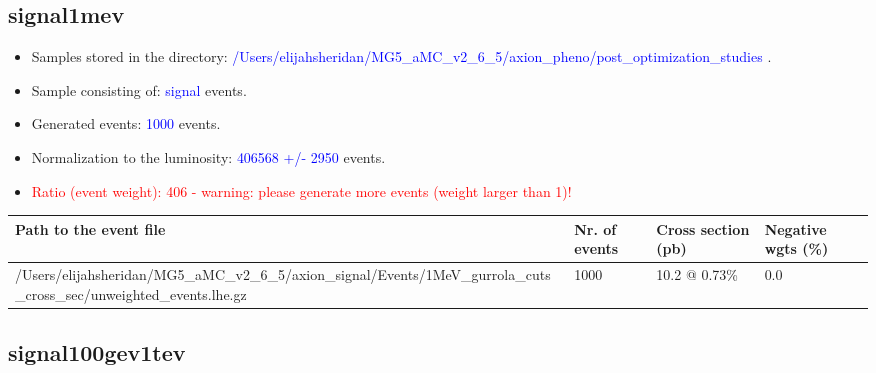 \documentclass[a4paper, 10pt]{article}
\begin{document}
\subsection{ signal1mev}

\begin{itemize}
  \item Samples stored in the directory: \textcolor{blue}{/\-Users/\-elijahsheridan/\-MG5\_aMC\_v2\_6\_5/\-axion\_pheno/\-post\_optimization\_studies} .
   \item Sample consisting of: \textcolor{blue}{signal}  events.
   \item Generated events: \textcolor{blue}{1000 }  events.
   \item Normalization to the luminosity: \textcolor{blue}{406568}\textcolor{blue}{ +/\-- }\textcolor{blue}{2950 }  events.
   \item\textcolor{red}{Ratio (event weight): }\textcolor{red}{406 }\textcolor{red}{ - warning: please generate more events (weight larger than 1)!}
\textcolor{red}{}
\end{itemize}
\begin{table}[H]
  \begin{center}
    \begin{tabular}{|m{55.0mm}|m{25.0mm}|m{30.0mm}|m{30.0mm}|}
      \hline
      {\cellcolor{yellow}         Path to the event file}& {\cellcolor{yellow}         Nr. of events}& {\cellcolor{yellow}         Cross section (pb)}& {\cellcolor{yellow}         Negative wgts (\%)}\\
      \hline
      {\cellcolor{white}          /\-Users/\-elijahsheridan/\-MG5\_aMC\_v2\_6\_5/\-axion\_signal/\-Events/\-1MeV\_gurrola\_cuts\_cross\_sec/\-unweighted\_events.lhe.gz}& {\cellcolor{white}          1000}& {\cellcolor{white}          10.2 @ 0.73\%}& {\cellcolor{white}          0.0}\\
\hline
    \end{tabular}
  \end{center}
\end{table}

\subsection{ signal100gev1tev}
\end{document}
